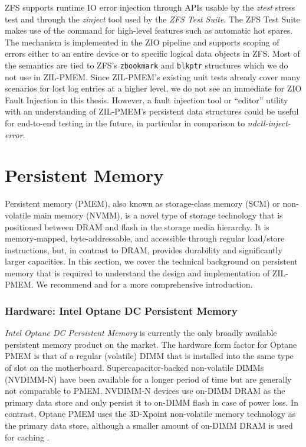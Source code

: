 \documentclass[12pt,a4paper,twoside]{book}
\begin{document}
ZFS supports runtime IO error injection through APIs usable by the \textit{ztest} stress test and through the \textit{zinject} tool used by the \textit{ZFS Test Suite}.
The ZFS Test Suite makes use of the command for high-level features such as automatic hot spares.
The mechanism is implemented in the ZIO pipeline and supports scoping of errors either to an entire device or to specific logical data objects in ZFS.
Most of the semantics are tied to ZFS’s \lstinline{zbookmark} and \lstinline{blkptr} structures which we do not use in ZIL-PMEM.
Since ZIL-PMEM's existing unit tests already cover many scenarios for lost log entries at a higher level, we do not see an immediate for ZIO Fault Injection in this thesis.
However, a fault injection tool or ``editor'' utility with an understanding of ZIL-PMEM's persistent data structures could be useful for end-to-end testing in the future, in particular in comparison to \textit{ndctl-inject-error}.

\section{Persistent Memory}
Persistent memory (PMEM), also known as storage-class memory (SCM) or non-volatile main memory (NVMM), is a novel type of storage technology that is positioned between DRAM and flash in the storage media hierarchy.
It is memory-mapped, byte-addressable, and accessible through regular load/store instructions, but, in contrast to DRAM, provides durability and significantly larger capacities.
In this section, we cover the technical background on persistent memory that is required to understand the design and implementation of ZIL-PMEM.
We recommend \cite{rudoffPersistentMemoryProgramming2017} and \cite{Scargall2020} for a more comprehensive introduction.

\subsubsection{Hardware: Intel Optane DC Persistent Memory}
\textit{Intel Optane DC Persistent Memory} is currently the only broadly available persistent memory product on the market.
The hardware form factor for Optane PMEM is that of a regular (volatile) DIMM that is installed into the same type of slot on the motherboard.
Supercapacitor-backed non-volatile DIMMs (NVDIMM-N) have been available for a longer period of time but are generally not comparable to PMEM.
NVDIMM-N devices use on-DIMM DRAM as the primary data store and only persist it to on-DIMM flash in case of power loss.
In contrast, Optane PMEM uses the 3D-Xpoint non-volatile memory technology as the primary data store, although a smaller amount of on-DIMM DRAM is used for caching \cite{yangEmpiricalGuideBehavior2020}.
\end{document}
